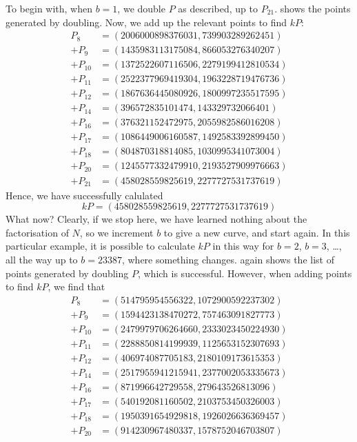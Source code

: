 To begin with, when $b=1$, we double $P$ as described, up to $P_{21}$.
 shows the points generated by doubling.
Now, we add up the relevant points to find $kP$:
\begin{align*}
	P_{8} &= (2006000898376031, 739903289262451)\\
	+ P_{9} &= (1435983113175084, 866053276340207)\\
	+ P_{10} &= (1372522607116506, 2279199412810534)\\
	+ P_{11} &= (2522377969419304, 1963228719476736)\\
	+ P_{12} &= (1867636445080926, 1800997235517595)\\
	+ P_{14} &= (396572835101474, 143329732066401)\\
	+ P_{16} &= (376321152472975, 2055982586016208)\\
	+ P_{17} &= (1086449006160587, 1492583392899450)\\
	+ P_{18} &= (804870318814085, 1030995341073004)\\
	+ P_{20} &= (1245577332479910, 2193527909976663)\\
	+ P_{21} &= (458028559825619, 2277727531737619)
\end{align*}
Hence, we have successfully calulated
$$kP = (458028559825619,2277727531737619)$$
What now?
Clearly, if we stop here, we have learned nothing about the factorisation of $N$, so we increment $b$ to give a new curve, and start again.
In this particular example, it is possible to calculate $kP$ in this way for $b=2$, $b=3$, \ldots, all the way up to $b=23387$, where something changes.
 again shows the list of points generated by doubling $P$, which is successful.
However, when adding points to find $kP$, we find that
\begin{align*}
	P_{8} &= (514795954556322, 1072900592237302)\\
	+ P_{9} &= (1594423138470272, 757463091827773)\\
	+ P_{10} &= (2479979706264660, 2333023450224930)\\
	+ P_{11} &= (2288850814199939, 1125653152307693)\\
	+ P_{12} &= (406974087705183, 2180109173615353)\\
	+ P_{14} &= (2517955941215941, 2377002053335673)\\
	+ P_{16} &= (871996642729558, 279643526813096)\\
	+ P_{17} &= (540192081160502, 2103753450326003)\\
	+ P_{18} &= (1950391654929818, 1926026636369457)\\
	+ P_{20} &= (914230967480337, 1578752046703807)
\end{align*}
